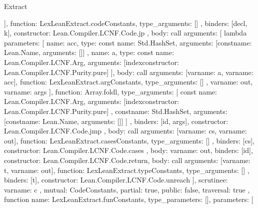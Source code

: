 \begin{lexlean}{Extract}
\begin{toolingmodule}
{{{{{{                }
              ],
              function: LexLeanExtract.codeConstants,
              type_arguments: []
            },
            binders: [decl, k],
            constructor: Lean.Compiler.LCNF.Code.jp
          },
          {
            body: call{
              arguments: [
                lambda{
                  parameters: [
                    {
                      name: acc,
                      type: const{
                        name: Std.HashSet,
                        arguments: [const{name: Lean.Name, arguments: []}]
                      }
                    },
                    {
                      name: a,
                      type: const{
                        name: Lean.Compiler.LCNF.Arg,
                        arguments: [index{constructor: Lean.Compiler.LCNF.Purity.pure}]
                      }
                    }
                  ],
                  body: call{
                    arguments: [var{name: a}, var{name: acc}],
                    function: LexLeanExtract.argConstants,
                    type_arguments: []
                  }
                },
                var{name: out},
                var{name: args}
              ],
              function: Array.foldl,
              type_arguments: [
                const{
                  name: Lean.Compiler.LCNF.Arg,
                  arguments: [index{constructor: Lean.Compiler.LCNF.Purity.pure}]
                },
                const{name: Std.HashSet, arguments: [const{name: Lean.Name, arguments: []}]}
              ]
            },
            binders: [id, args],
            constructor: Lean.Compiler.LCNF.Code.jmp
          },
          {
            body: call{
              arguments: [var{name: cs}, var{name: out}],
              function: LexLeanExtract.casesConstants,
              type_arguments: []
            },
            binders: [cs],
            constructor: Lean.Compiler.LCNF.Code.cases
          },
          {body: var{name: out}, binders: [id], constructor: Lean.Compiler.LCNF.Code.return},
          {
            body: call{
              arguments: [var{name: t}, var{name: out}],
              function: LexLeanExtract.typeConstants,
              type_arguments: []
            },
            binders: [t],
            constructor: Lean.Compiler.LCNF.Code.unreach
          }
        ],
        scrutinee: var{name: c}
      },
      mutual: CodeConstants,
      partial: true,
      public: false,
      traversal: true
    },
    function{
      name: LexLeanExtract.funConstants,
      type_parameters: [],
      parameters: [
}}
\end{toolingmodule}
\end{lexlean}
